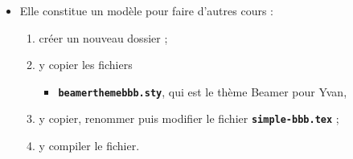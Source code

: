   \begin{itemize}
  \item Elle constitue un modèle pour faire d'autres cours :
      
    \begin{enumerate}
    \item créer un nouveau dossier ;
    \item y copier les fichiers 
      
      \begin{itemize}
      \item \texttt{\textbf{beamerthemebbb.sty}}, qui est le thème Beamer pour Yvan,
      \end{itemize}
      
    \item y copier, renommer puis modifier le fichier \texttt{\textbf{simple-bbb.tex}} ;
    \item y compiler le fichier.
    \end{enumerate}
  \end{itemize}
